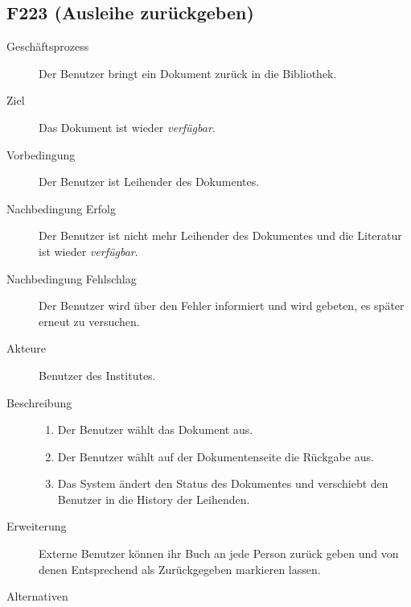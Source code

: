 \subsection{F223 (Ausleihe zurückgeben)}
\begin{description}
  \item[Geschäftsprozess]Der Benutzer bringt ein Dokument zurück in die Bibliothek.
  \item[Ziel]Das Dokument ist wieder \emph{verfügbar}.
  \item[Vorbedingung]Der Benutzer ist Leihender des Dokumentes.
  \item[Nachbedingung Erfolg]Der Benutzer ist nicht mehr Leihender des Dokumentes und die Literatur ist wieder \emph{verfügbar}.
  \item[Nachbedingung Fehlschlag]Der Benutzer wird über den Fehler informiert und wird gebeten, es später erneut zu versuchen.
  \item[Akteure]Benutzer des Institutes.
  \item[Beschreibung]\hfill
    \begin{enumerate}
      \item Der Benutzer wählt das Dokument aus.
      \item Der Benutzer wählt auf der Dokumentenseite die Rückgabe aus.
      \item Das System ändert den Status des Dokumentes und verschiebt den Benutzer in die History der Leihenden.
    \end{enumerate}
  \item[Erweiterung]Externe Benutzer können ihr Buch an jede Person zurück geben und von denen Entsprechend als Zurückgegeben markieren lassen.
  \item[Alternativen]
\end{description}

